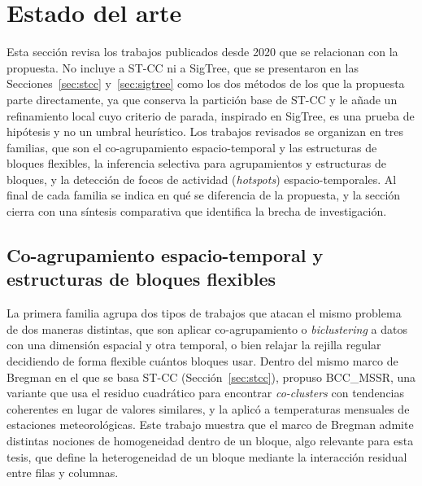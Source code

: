 
\section{Estado del arte}
\label{sec:estado-arte}

Esta sección revisa los trabajos publicados desde 2020 que se relacionan con la
propuesta. No incluye a \ac{ST-CC} ni a SigTree, que se presentaron en las
Secciones~\ref{sec:stcc} y~\ref{sec:sigtree} como los dos métodos de los que la
propuesta parte directamente, ya que conserva la partición base de \ac{ST-CC} y le
añade un refinamiento local cuyo criterio de parada, inspirado en SigTree, es una
prueba de hipótesis y no un umbral heurístico. Los trabajos revisados se
organizan en tres familias, que son el co-agrupamiento espacio-temporal y las
estructuras de bloques flexibles, la inferencia selectiva para agrupamientos y
estructuras de bloques, y la detección de focos de actividad (\emph{hotspots})
espacio-temporales. Al final de cada familia se indica en qué se diferencia de la
propuesta, y la sección cierra con una síntesis comparativa que identifica la
brecha de investigación.

\subsection{Co-agrupamiento espacio-temporal y estructuras de bloques flexibles}
\label{sec:ea_coagrupamiento}

La primera familia agrupa dos tipos de trabajos que atacan el mismo
problema de dos maneras distintas, que son aplicar co-agrupamiento o \emph{biclustering} a
datos con una dimensión espacial y otra temporal, o bien relajar la rejilla
regular decidiendo de forma flexible cuántos bloques usar. Dentro del mismo marco de Bregman en el que se basa \ac{ST-CC}
(Sección~\ref{sec:stcc}), \cite{Wu2022} propuso BCC\_MSSR, una
variante que usa el residuo cuadrático para encontrar \emph{co-clusters} con
tendencias coherentes en lugar de valores similares, y la aplicó a
temperaturas mensuales de estaciones meteorológicas. Este trabajo muestra
que el marco de Bregman admite distintas nociones de homogeneidad dentro de
un bloque, algo relevante para esta tesis, que define la heterogeneidad de
un bloque mediante la interacción residual entre filas y columnas.

